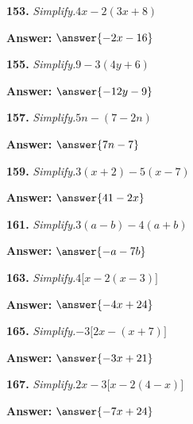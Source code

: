 \documentclass{ximera}
\begin{document}
\begin{problem}
\textbf{153.} \emph{Simplify.}\quad $4x - 2(3x + 8)$

\textbf{Answer:} $\answer{-2x -16}$
\end{problem}

\begin{problem}
\textbf{155.} \emph{Simplify.}\quad $9 - 3(4y + 6)$

\textbf{Answer:} $\answer{-12y -9}$
\end{problem}

\begin{problem}
\textbf{157.} \emph{Simplify.}\quad $5n - (7 - 2n)$

\textbf{Answer:} $\answer{7n -7}$
\end{problem}

\begin{problem}
\textbf{159.} \emph{Simplify.}\quad $3(x + 2) - 5(x - 7)$

\textbf{Answer:} $\answer{41 -2x}$
\end{problem}

\begin{problem}
\textbf{161.} \emph{Simplify.}\quad $3(a - b) - 4(a + b)$

\textbf{Answer:} $\answer{-a -7b}$
\end{problem}

\begin{problem}
\textbf{163.} \emph{Simplify.}\quad $4\bigl[x - 2(x - 3)\bigr]$

\textbf{Answer:} $\answer{-4x+24}$
\end{problem}

\begin{problem}
\textbf{165.} \emph{Simplify.}\quad $-3\bigl[2x - (x + 7)\bigr]$

\textbf{Answer:} $\answer{-3x+21}$
\end{problem}

\begin{problem}
\textbf{167.} \emph{Simplify.}\quad $2x - 3\bigl[x - 2(4 - x)\bigr]$

\textbf{Answer:} $\answer{-7x+24}$
\end{problem}
\end{document}
